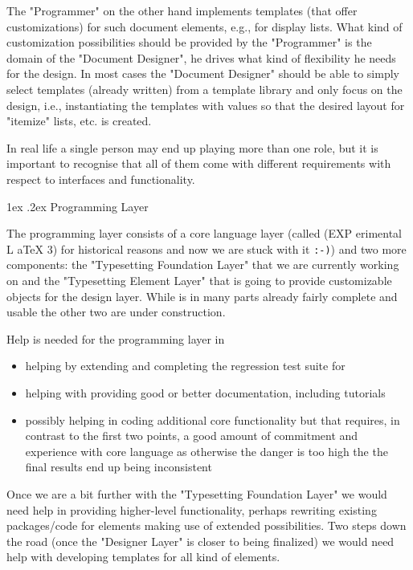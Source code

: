 \documentclass{ltnews}
\makeatletter
\newcommand{\@subheadingfont}{%
   \sffamily\slshape
   \let\LaTeX\cmssLaTeX\let\TeX\cmssTeX
}
\renewcommand{\subsection}{%
   \@startsection
      {subsection}{2}{\z@}{-1.5ex \@plus -1ex \@minus -.2ex}%
      {1ex \@plus.2ex}{\@subheadingfont}%
}
\makeatother
\begin{document}
The "Programmer" on the other hand implements templates (that offer customizations) for such document elements, e.g., for display lists. What kind of customization possibilities should be provided by the "Programmer" is the domain of the "Document Designer", he drives what kind of flexibility he needs for the design. In most cases the "Document Designer" should be able to simply select templates (already written) from a template library and only focus on the design, i.e., instantiating the templates with values so that the desired layout for "itemize" lists, etc. is created.

In real life a single person may end up playing more than one role, but it is important to recognise that all of them come with different requirements with respect to interfaces and functionality.

\subsection{Programming Layer}

The programming layer consists of a core language layer (called  (EXP erimental L aTeX 3) for historical reasons and now we are stuck with it \texttt{:-)}) and two more components: the "Typesetting Foundation Layer" that we are currently working on and the "Typesetting Element Layer" that is going to provide customizable objects for the design layer. While  is in many parts already fairly complete and usable the other two are under construction.

Help is needed for the programming layer in
\begin{itemize}
\item helping by extending and completing the regression test suite for 
\item helping with providing good or better documentation, including tutorials
\item possibly helping in coding additional core functionality but that requires, in contrast to the first two points, a good amount of commitment and experience with core language as otherwise the danger is too high the the final results end up being inconsistent
\end{itemize}
Once we are a bit further with the "Typesetting Foundation Layer" we would need help in
providing higher-level functionality, perhaps rewriting existing packages/code for elements making use of extended possibilities.
Two steps down the road (once the "Designer Layer" is closer to being finalized) we would need help with developing templates for all kind of elements.
\end{document}
